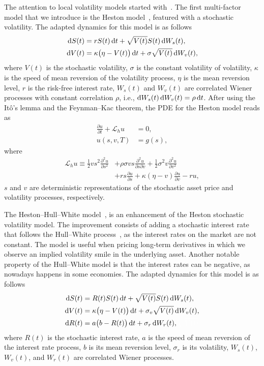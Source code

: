 \documentclass{UUThesisTemplate}
\begin{document}
\par
The attention to local volatility models started with~\cite{dupire1994pricing}. The first multi-factor model that we introduce is the Heston model~\cite{heston1993closed}, featured with a stochastic volatility. The adapted dynamics for this model is as follows
\begin{align}
\dif S(t) & =  rS(t)\dif t + \sqrt{V(t)} S(t) \dif W_s(t), \label{qlsvSDE1} \\
\dif V(t) & =  \kappa\big(\eta-V(t)\big)\dif t + \sigma \sqrt{V(t)}\dif W_v(t), \label{qlsvSDE2}
\end{align}
where $V(t)$ is the stochastic volatility, $\sigma$ is the constant volatility of volatility, $\kappa$ is the speed of mean reversion of the volatility process, $\eta$ is the mean reversion level, $r$ is the risk-free interest rate, $W_s(t)$ and $W_v(t)$ are correlated Wiener processes with constant correlation $\rho$, i.e., $\dif W_s(t) \dif W_v(t) = \rho \dif t$. After using the It\^{o}'s lemma and the Feynman--Kac theorem, the PDE for the Heston model reads as
\begin{align}
\frac{\partial u}{\partial t}+\mathcal{L}_h u&=0, \nonumber \\
u(s,v,T) &= g(s), \label{hstPDE}
\end{align}
where
\begin{align}
\mathcal{L}_{h} u \equiv \frac{1}{2}vs^2\frac{\partial^2 u}{\partial s^2} &+ \rho\sigma v s \frac{\partial^2 u}{\partial s\partial v} + \frac{1}{2}\sigma^2v\frac{\partial^2 u}{\partial v^2} \nonumber \\ 
               &+ rs\frac{\partial u}{\partial s} + \kappa(\eta-v)\frac{\partial u}{\partial v} - ru, \label{eqHSTop}
\end{align}
$s$ and $v$ are deterministic representations of the stochastic asset price and volatility processes, respectively.

\par
The Heston--Hull--White model~\cite{grzelak2011heston, grzelak2012extension}, is an enhancement of the Heston stochastic volatility model. The improvement consists of adding a stochastic interest rate that follows the Hull--White process~\cite{hull1990pricing}, as the interest rates on the market are not constant. The model is useful when pricing long-term derivatives in which we observe an implied volatility smile in the underlying asset. Another notable property of the Hull--White model is that the interest rates can be negative, as nowadays happens in some economies. The adapted dynamics for this model is as follows
\begin{align}
\dif S(t) & =  R(t)S(t)\dif t + \sqrt{V(t)}S(t)\dif W_s(t), \label{hhwSDE1} \\
\dif V(t) & =  \kappa\big(\eta-V(t)\big)\dif t + \sigma_v \sqrt{V(t)}\dif W_v(t), \label{hhwSDE2} \\
\dif R(t) & = a\big(b-R(t)\big)\dif t + \sigma_r\dif W_r(t), {\color{white} \sqrt{V(t)}} \label{hhwSDE3}
\end{align}
where $R(t)$ is the stochastic interest rate, $a$ is the speed of mean reversion of the interest rate process, $b$ is its mean reversion level, $\sigma_r$ is its volatility,  $W_s(t)$, $W_v(t)$,  and $W_r(t)$ are correlated Wiener processes.
\end{document}
